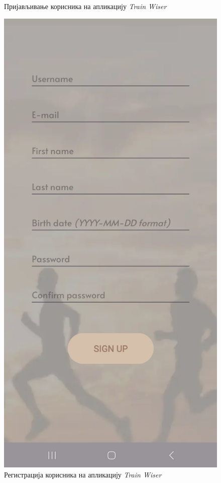 \documentclass[12pt,oneside]{memoir}
\begin{document}
\begin{figure}[h]
\begin{minipage}{0.45\textwidth}
    \caption{Пријављивање корисника на апликацију \textit{Train Wiser}}
    \label{pic:user_log_in}
  \end{minipage}
  \hspace{0.05\textwidth} 
  \begin{minipage}{0.45\textwidth}
    \centering
    \includegraphics[scale=0.12]{assets/pictures/app_screenshots/signup.jpg}
    \caption{Регистрација корисника на апликацију \textit{Train Wiser}}
    \label{pic:user_sign_up}
  \end{minipage}
\end{figure}
\end{document}
